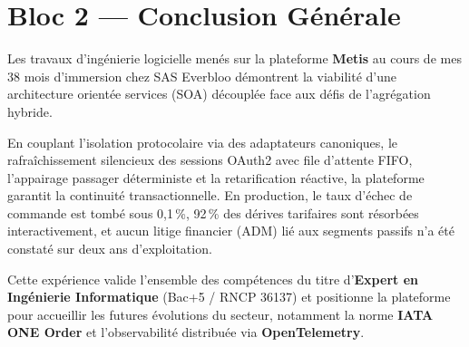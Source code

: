 \documentclass[11pt,a4paper]{article}
\begin{document}
\vspace{0.3cm}
\section*{Bloc 2 — Conclusion Générale}
Les travaux d'ingénierie logicielle menés sur la plateforme \textbf{Metis} au cours de mes 38 mois d'immersion chez SAS Everbloo démontrent la viabilité d'une architecture orientée services (SOA) découplée face aux défis de l'agrégation hybride.

En couplant l'isolation protocolaire via des adaptateurs canoniques, le rafraîchissement silencieux des sessions OAuth2 avec file d'attente FIFO, l'appairage passager déterministe et la retarification réactive, la plateforme garantit la continuité transactionnelle. En production, le taux d'échec de commande est tombé sous 0,1\,\%, 92\,\% des dérives tarifaires sont résorbées interactivement, et aucun litige financier (ADM) lié aux segments passifs n'a été constaté sur deux ans d'exploitation.

Cette expérience valide l'ensemble des compétences du titre d'\textbf{Expert en Ingénierie Informatique} (Bac+5 / RNCP 36137) et positionne la plateforme pour accueillir les futures évolutions du secteur, notamment la norme \textbf{IATA ONE Order} et l'observabilité distribuée via \textbf{OpenTelemetry}.

\newpage
\end{document}
